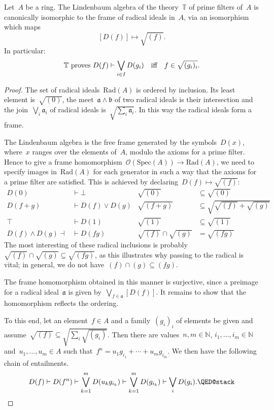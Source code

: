 \documentclass{ws-rv9x6}
\renewcommand{\O}{\mathcal{O}}
\newcommand{\NN}{\mathbb{N}}
\newcommand{\TT}{\mathbb{T}}
\newcommand{\aaa}{\mathfrak{a}}
\newcommand{\bbb}{\mathfrak{b}}
\newcommand{\Spec}{\mathrm{Spec}}
\newcommand{\Rad}{\mathrm{Rad}}
\renewcommand{\_}{\mathpunct{.}}
\newcommand{\?}{\,{:}\,}
\begin{document}
\begin{theorem}\label{thm:workhorse}
Let~$A$ be a ring. The Lindenbaum algebra of the theory~$\TT$ of prime filters
of~$A$ is canonically isomorphic to the frame of radical ideals in~$A$, via an
isomorphism which maps
\[ [D(f)] \longmapsto \sqrt{(f)}. \]
In particular:
\[
  \textnormal{$\TT$ proves~$D(f) \vdash \bigvee_{i \in I} D(g_i)$} \quad\text{iff}\quad
    f \in \sqrt{(g_i)_i}. \]
\end{theorem}

\begin{proof}The set of radical ideals~$\Rad(A)$ is ordered by inclusion. Its
least element is~$\sqrt{(0)}$, the meet~$\aaa \wedge \bbb$ of two radical
ideals is their intersection and the join~$\bigvee_i \aaa_i$ of radical ideals
is~$\sqrt{\sum_i \aaa_i}$. In this way the radical ideals form a frame.

The Lindenbaum algebra is the free frame generated by the symbols~$D(x)$,
where~$x$ ranges over the elements of~$A$, modulo the axioms for a prime
filter. Hence to give a frame homomorphism~$\O(\Spec(A)) \to \Rad(A)$, we need
to specify images in~$\Rad(A)$ for each generator in such a way that the
axioms for a prime filter are satisfied. This is achieved by declaring~$D(f)
\mapsto \sqrt{(f)}$:
\begin{align*}
  D(0) &\vdash \bot & \sqrt{(0)} &\subseteq \sqrt{(0)} \\
  D(f+g) &\vdash D(f) \vee D(g) & \sqrt{(f+g)} &\subseteq\textstyle \sqrt{\sqrt{(f)} + \sqrt{(g)}} \\
  \top &\vdash D(1) & \sqrt{(1)} &\subseteq \sqrt{(1)} \\
  D(f) \wedge D(g) \dashv\!&\vdash D(fg) & \sqrt{(f)} \cap \sqrt{(g)} &= \sqrt{(fg)}
\end{align*}
The most interesting of these radical inclusions is probably~$\sqrt{(f)} \cap
\sqrt{(g)} \subseteq \sqrt{(fg)}$, as this illustrates why passing to the
radical is vital; in general, we do not have~$(f) \cap (g) \subseteq (fg)$.

The frame homomorphism obtained in this manner is surjective, since a preimage
for a radical ideal~$\aaa$ is given by~$\bigvee_{f \in \aaa} [D(f)]$. It
remains to show that the homomorphism reflects the ordering.

To this end, let an element~$f \in A$ and a family~$(g_i)_i$ of elements be
given and assume~$\sqrt{(f)} \subseteq \sqrt{\sum_i \sqrt{(g_i)}}$. Then there
are values~$n,m \in \NN$, $i_1,\ldots,i_m \in \NN$ and~$u_1,\ldots,u_m \in
A$ such that~$f^n = u_1 g_{i_1} + \cdots + u_m g_{i_m}$. We then have the
following chain of entailments.
\[
  D(f) \vdash
  D(f^n) \vdash
  \bigvee_{k=1}^m D(u_k g_{i_k}) \vdash
  \bigvee_{k=1}^m D(g_{i_k}) \vdash
  \bigvee_i D(g_i). \qedhere
\]
\end{proof}
\end{document}
